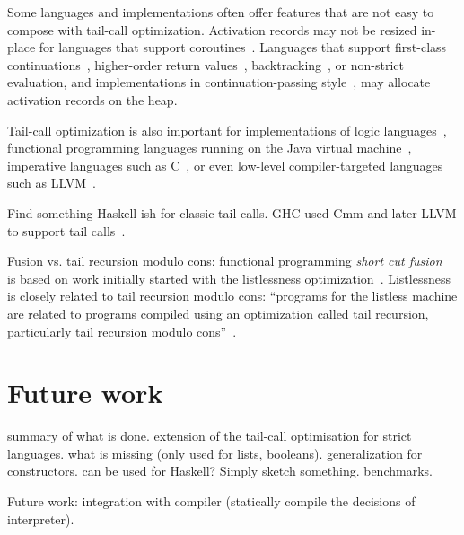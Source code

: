 \documentclass[diploma]{softlab-thesis}
\begin{document}
Some languages and implementations often offer features that are not
easy to compose with tail-call optimization. Activation records may
not be resized in-place for languages that support
coroutines~\cite[p.~60]{Waite84}. Languages that support first-class
continuations~\cite{Sperber10}, higher-order return
values~\cite[p.~103]{Appel92}\cite{Steele78},
backtracking~\cite{Bobrow73}, or non-strict evaluation, and
implementations in continuation-passing style~\cite[p.~103]{Appel92},
may allocate activation records on the heap. 

Tail-call optimization is also important for implementations of logic languages~\cite{Bigot99},
functional programming languages running on the Java virtual machine~\cite{Madsen:2018:TCE:3178372.3179499},
imperative languages such as C~\cite{baueran:mthesis:2003,Probst01}, or even low-level compiler-targeted languages such as
LLVM~\cite{Pandey:2015:LC:2842773}.

Find something Haskell-ish for classic tail-calls. GHC used Cmm and 
later LLVM to support tail calls~\cite{Terei:2010:LBG:1863523.1863538}.

Fusion vs. tail recursion modulo cons: functional programming \emph{short cut fusion}~\cite{Gill:1993:SCD:165180.165214,Pardo16} is based on work initially started with the listlessness optimization~\cite{Wadler84}. Listlessness is closely related to tail recursion modulo cons: ``programs for the listless machine are related to programs compiled using an optimization called tail recursion, particularly tail recursion modulo cons''~\cite{Wadler84}.


\chapter{Future work}
\label{ch:future}

summary of what is done.
extension of the tail-call optimisation for strict
languages.
what is missing (only used for lists, booleans).
generalization for constructors.
can be used for Haskell? Simply sketch something.
benchmarks.

Future work: integration with compiler (statically compile the decisions of interpreter).








\backmatter


\end{document}
